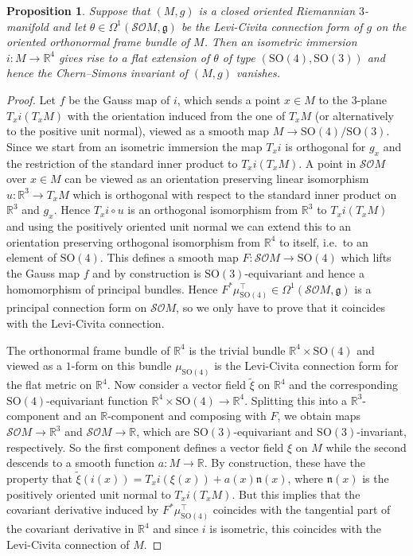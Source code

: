 \documentclass[british,11pt,a4paper]{amsart}
\numberwithin{equation}{section}
\renewcommand\frak{\mathfrak}
\renewcommand\Bbb{\mathbb}
\newcommand\Cal{\mathcal}
\newcommand{\x}{\times}
\renewcommand{\o}{\circ}
\newcommand{\Om}{\Omega}
\newcommand*{\R}{\mathbb{R}}
\newcommand{\col}{:}
\newcounter{theorem}
\numberwithin{theorem}{section}
\newtheorem{prop}[theorem]{Proposition}
\theoremstyle{definition}
\theoremstyle{remark}
\begin{document}
\begin{prop}\label{prop:Riemann-flat-ext}
Suppose that $(M,g)$ is a closed oriented Riemannian $3$-manifold and let
$\theta\in\Om^1(\Cal{SO}M,\frak{g})$ be the Levi-Civita connection form of $g$ on the
oriented orthonormal frame bundle of $M$. Then an isometric immersion $i\col M\to
\R^4$ gives rise to a flat extension of $\theta$ of type
$(\mathrm{SO}(4),\mathrm{SO}(3))$ and hence the Chern--Simons invariant of $(M,g)$
vanishes.
\end{prop}
\begin{proof}
Let $f$ be the Gauss map of $i$, which sends a point $x\in M$ to the $3$-plane
$T_xi(T_xM)$ with the orientation induced from the one of $T_xM$  (or
  alternatively to the positive unit normal), viewed as a smooth map $M\to
\mathrm{SO}(4)/\mathrm{SO}(3)$. Since we start from an isometric immersion the map
$T_xi$ is orthogonal for $g_x$ and the restriction of the standard inner product to
$T_xi(T_xM)$. A point in $\Cal{SO}M$ over $x\in M$ can be viewed as an orientation
preserving linear isomorphism $u\col \R^3\to T_xM$ which is orthogonal with respect
to the standard inner product on $\R^3$ and $g_x$. Hence $T_xi\o u$ is an orthogonal
isomorphism from $\R^3$ to $T_xi(T_xM)$ and using the positively oriented unit normal
we can extend this to an orientation preserving orthogonal isomorphism from $\R^4$ to
itself, i.e.\ to an element of $\mathrm{SO}(4)$. This defines a smooth map $F\col
\Cal{SO}M\to \mathrm{SO}(4)$ which lifts the Gauss map $f$ and by construction is
$\mathrm{SO}(3)$-equivariant and hence a homomorphism of principal bundles. Hence
$F^*\mu_{\mathrm{SO}(4)}^\top\in\Om^1(\Cal{SO}M,\frak{g})$ is a principal connection
form on $\Cal{SO}M$, so we only have to prove that it coincides with the Levi-Civita
connection.

The orthonormal frame bundle of $\R^4$ is the trivial bundle $\R^4\x \mathrm{SO}(4)$
and viewed as a $1$-form on this bundle $\mu_{\mathrm{SO}(4)}$ is the Levi-Civita
connection form for the flat metric on $\R^4$. Now consider a vector field
$\tilde\xi$ on $\R^4$ and the corresponding $\mathrm{SO}(4)$-equivariant function
$\Bbb R^4\x \mathrm{SO}(4)\to\R^4$. Splitting this into a $\R^3$-component and an
$\Bbb R$-component and composing with $F$, we obtain maps $\Cal{SO}M\to\R^3$ and
$\Cal{SO}M\to\R$, which are $\mathrm{SO}(3)$-equivariant and
$\mathrm{SO}(3)$-invariant, respectively. So the first component defines a vector
field $\xi$ on $M$ while the second descends to a smooth function $a\col
M\to\R$. By construction, these have the property that
$\tilde\xi(i(x))=T_xi(\xi(x))+a(x)\frak{n}(x)$, where $\frak{n}(x)$ is the positively
oriented unit normal to $T_xi(T_xM)$. But this implies that the covariant derivative
induced by $F^*\mu_{\mathrm{SO}(4)}^\top$ coincides with the tangential part of the
covariant derivative in $\R^4$ and since $i$ is isometric, this coincides with the
Levi-Civita connection of $M$.
\end{proof}
\end{document}
